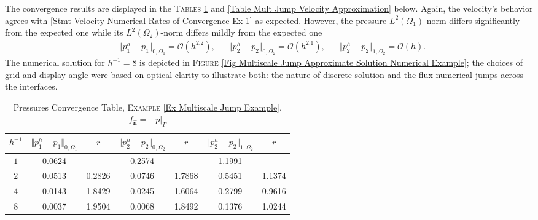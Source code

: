 \documentclass[3p]{elsarticle}
\def\uone{\mathbf{u}_{1}}
\def\uoneh{\mathbf{u}_{1}^{h}}
\def\utwo{\mathbf{u}_{2}}
\def\utwoh{\mathbf{u}_{2}^{h}}
\def\Hdiv{\mathbf{H_{div}}}
\def\pone{p_{1}}
\def\poneh{p_{1}^{h}}
\def\ptwo{p_{2}}
\def\ptwoh{p_{2}^{h}}
\def\flux{f_{\bm{\hat{n}} } }
\begin{document}
\begin{example}
The convergence results are displayed in the \textsc{Tables} \ref{Table Mult Jump Pressure Approximation} and \ref{Table Mult Jump Velocity Approximation} below. Again, the velocity's behavior agrees with \eqref{Stmt Velocity Numerical Rates of Convergence Ex 1} as expected. However, the pressure $ L^{2}(\Omega_{1}) $-norm differs significantly from the expected one while its $ L^{2}(\Omega_{2}) $-norm differs mildly from the expected one 
%
%
\begin{align}\label{Stmt Pressure Numerical Rates of Convergence Ex 4}
& \Vert \poneh - \pone \Vert_{0, \Omega_{1}} = \mathcal{O}(h^{2.2}) ,&
& \Vert \ptwoh - \ptwo \Vert_{0, \Omega_{2}} = \mathcal{O}(h^{2.1}) , &
& \Vert \ptwoh - \ptwo \Vert_{1, \Omega_{2}} = \mathcal{O}(h) . 
\end{align}
%
%
The numerical solution for $ h^{-1} = 8 $ is depicted in \textsc{Figure} \ref{Fig Multiscale Jump Approximate Solution Numerical Example}; the choices of grid and display angle were based on optical clarity to illustrate both: the nature of discrete solution and the flux numerical jumps across the interfaces. 
%
\begin{table}[h!]
\caption{Pressures Convergence Table, \textsc{Example} \ref{Ex Multiscale Jump Example}, $ \flux = - p\big\vert_{\Gamma} $}\label{Table Mult Jump Pressure Approximation}
\def\arraystretch{1.4}
\begin{center}
\begin{tabular}{ c c c c c c c }
    \hline
    \rowcolor{gray!50}
$ h^{-1} $  
& $\Vert  \poneh- p_{1}  \Vert_{ 0, \Omega_{1} } $ 
& $r$  
& $\Vert  \ptwoh- p_{2}  \Vert_{0, \Omega_{2} }$ 
& $r$
& $\Vert  \ptwoh- p_{2}  \Vert_{1, \Omega_{2} }$ 
& $r$ \\ %
    \toprule
$ 1 $ &   0.0624  &   &  0.2574  &  &   1.1991 &   \\
$ 2 $  &  0.0513  &  0.2826  &  0.0746  & 1.7868   & 0.5451  &  1.1374   \\
$ 4 $ &   0.0143  &  1.8429 &  0.0245  & 1.6064    &  0.2799  &   0.9616   \\
$ 8 $  &  0.0037  &    1.9504 &  0.0068  & 1.8492   &  0.1376  &  1.0244    \\ 

\end{tabular}
\end{center}
\end{table}
\end{example}
\end{document}
